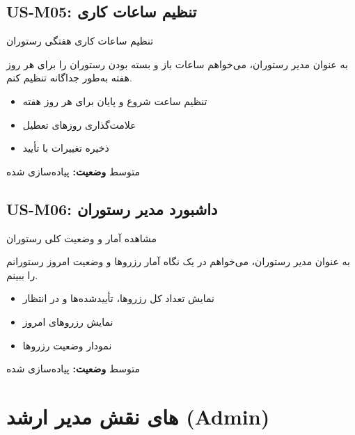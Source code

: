 \documentclass[12pt, a4paper]{article}
\begin{document}
\subsection{US-M05: تنظیم ساعات کاری}
\begin{description}[rightmargin=0.5cm]
  \item[عنوان:] تنظیم ساعات کاری هفتگی رستوران
  \item[داستان:] به عنوان مدیر رستوران، می‌خواهم ساعات باز و بسته بودن رستوران را برای
  هر روز هفته به‌طور جداگانه تنظیم کنم.
  \item[معیارهای پذیرش:]
  \begin{itemize}[rightmargin=0.5cm]
    \item تنظیم ساعت شروع و پایان برای هر روز هفته
    \item علامت‌گذاری روزهای تعطیل
    \item ذخیره تغییرات با تأیید
  \end{itemize}
  \item[اولویت:] متوسط \quad \textbf{وضعیت:} پیاده‌سازی شده
\end{description}

\subsection{US-M06: داشبورد مدیر رستوران}
\begin{description}[rightmargin=0.5cm]
  \item[عنوان:] مشاهده آمار و وضعیت کلی رستوران
  \item[داستان:] به عنوان مدیر رستوران، می‌خواهم در یک نگاه آمار رزروها و وضعیت امروز
  رستورانم را ببینم.
  \item[معیارهای پذیرش:]
  \begin{itemize}[rightmargin=0.5cm]
    \item نمایش تعداد کل رزروها، تأییدشده‌ها و در انتظار
    \item نمایش رزروهای امروز
    \item نمودار وضعیت رزروها
  \end{itemize}
  \item[اولویت:] متوسط \quad \textbf{وضعیت:} پیاده‌سازی شده
\end{description}

\newpage

\section{های نقش مدیر ارشد (Admin)}
\end{document}
